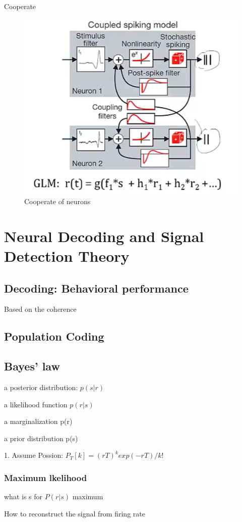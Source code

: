 \documentclass{book}
\begin{document}
Cooperate

\begin{figure}[h]
\centering
\includegraphics[width=0.7\linewidth]{figures/twoneuron}
\caption{Cooperate of neurons}
\label{fig:twoneuron}
\end{figure}

\chapter{Neural Decoding and Signal Detection Theory}

\section{Decoding: Behavioral performance}

Based on the coherence

\section{Population Coding}

\section{Bayes' law}

a posterior distribution: $p(s|r)$

a likelihood function $p(r|s)$

a marginalization p(r)

a prior distribution p(s)

1. Assume Possion: $P_T[k] = (rT)^k exp(-rT) /k!$

\subsection{Maximum lkelihood}

what is s for $P(r|s)$ maximum

How to reconstruct the signal from firing rate





 
\end{document}
